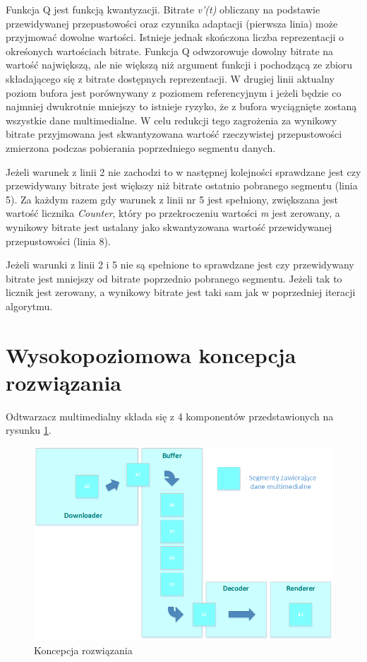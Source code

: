 Funkcja Q jest funkcją kwantyzacji. Bitrate \textit{v'(t)} obliczany na podstawie przewidywanej przepustowości oraz czynnika adaptacji (pierwsza linia) może przyjmować dowolne wartości. Istnieje jednak skończona liczba reprezentacji o okreśonych wartościach bitrate. Funkcja Q odwzorowuje dowolny bitrate na wartość największą, ale nie większą niż argument funkcji i pochodzącą ze zbioru składającego się z bitrate dostępnych reprezentacji. W drugiej linii aktualny poziom bufora jest porównywany z poziomem referencyjnym i jeżeli będzie co najmniej dwukrotnie mniejszy to istnieje ryzyko, że z bufora wyciągnięte zostaną wszystkie dane multimedialne. W celu redukcji tego zagrożenia za wynikowy bitrate przyjmowana jest skwantyzowana wartość rzeczywistej przepustowości zmierzona podczas pobierania poprzedniego segmentu danych. 

Jeżeli warunek z linii 2 nie zachodzi to w następnej kolejności sprawdzane jest czy przewidywany bitrate jest większy niż bitrate ostatnio pobranego segmentu (linia 5). Za każdym razem gdy warunek z linii nr 5 jest spełniony, zwiększana jest wartość licznika \textit{Counter}, który po przekroczeniu wartości \textit{m} jest zerowany, a wynikowy bitrate jest ustalany jako skwantyzowana wartość przewidywanej przepustowości (linia 8). 

Jeżeli warunki z linii 2 i 5 nie są spełnione to sprawdzane jest czy przewidywany bitrate jest mniejszy od bitrate poprzednio pobranego segmentu. Jeżeli tak to licznik jest zerowany, a wynikowy bitrate jest taki sam jak w poprzedniej iteracji algorytmu. 

\section{Wysokopoziomowa koncepcja rozwiązania}

Odtwarzacz multimedialny składa się z 4 komponentów przedstawionych na rysunku \ref{fig:ImplementationConceptual}. 

\begin{figure}[h!]
	\centering
		\includegraphics[width=\linewidth]{ImplementationConceptual}
	\caption{Koncepcja rozwiązania}
	\label{fig:ImplementationConceptual}
\end{figure}

